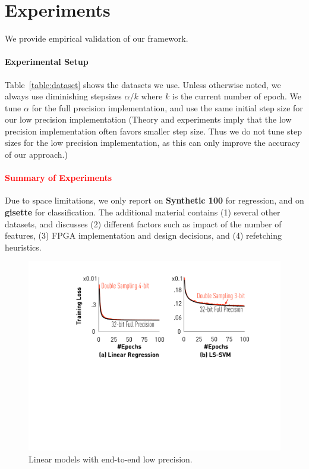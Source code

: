 \documentclass{article}
\begin{document}
\vspace{-0.5em}
\section{Experiments} \label{sec:exp}

\vspace{-0.5em}
We provide empirical validation of
our framework.

\vspace{-1em}
\paragraph{Experimental Setup} 
Table~\ref{table:dataset} shows the 
datasets we use. 
Unless otherwise noted, we always
use diminishing stepsizes $\alpha/k$
where $k$ is the current number of
epoch. We tune 
$\alpha$ for the full precision
implementation, and use the
same initial step size for 
our low precision 
implementation (Theory and
experiments imply that the low precision
implementation often favors smaller step size. 
Thus we do not tune step sizes for the low precision 
implementation, as this can only improve the accuracy of our approach.) 

\vspace{-1em}
\paragraph*{\textcolor{red}{Summary of Experiments}}
Due to space limitations, we only report on {\bf Synthetic 100} for regression, and on 
{\bf gisette} for classification. 
The additional material contains (1) several other datasets, 
and discusses (2) different
factors such as impact of the number of features, 
(3) FPGA implementation and design
decisions, and (4) refetching heuristics.


\begin{figure}[t]
\centering
\includegraphics[width=0.7\columnwidth]{final-experiments/linearmodel} 
\vspace{-1em}
\caption{Linear models with end-to-end low precision.}
\vspace{-1.5em}
\label{fig:convergence}
\end{figure}
\end{document}
